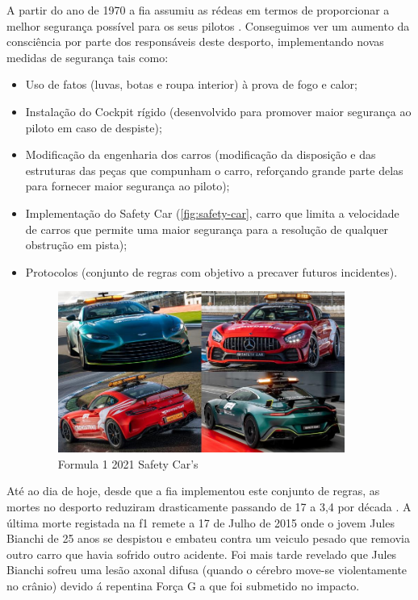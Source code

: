 \documentclass{report}
\begin{document}
A partir do ano de 1970 a \ac{fia} assumiu as rédeas em termos de proporcionar a melhor segurança possível para os seus pilotos \cite{fia}. Conseguimos ver um aumento da consciência por parte dos responsáveis deste desporto, implementando novas medidas de segurança tais como:
\begin{itemize}
\item Uso de fatos (luvas, botas e roupa interior) à prova de fogo e calor;
\item Instalação do Cockpit rígido (desenvolvido para promover maior segurança ao piloto em caso de despiste);
\item Modificação da engenharia dos carros (modificação da disposição e das estruturas das peças que compunham o carro, reforçando grande parte delas para fornecer maior segurança ao piloto);
\item Implementação do Safety Car \cite{safetycar} (\autoref{fig:safety-car}, carro que limita a velocidade de carros que permite uma maior segurança para a resolução de qualquer obstrução em pista);
\item Protocolos (conjunto de regras com objetivo a precaver futuros incidentes). 
\begin{figure}[h]
\center %
\includegraphics[height=150pt]{safety-car}
\caption{Formula 1 2021 Safety Car's}
\label{fig:safety-car}
\end{figure}

\end{itemize}

Até ao dia de hoje, desde que a \ac{fia} implementou este conjunto de regras, as mortes no desporto reduziram drasticamente passando de 17 a 3,4 por década \cite{acidentes}. A última morte registada na \ac{f1} remete a 17 de Julho de 2015 onde o jovem Jules Bianchi \cite{julesbianchi} de 25 anos se despistou e embateu contra um veiculo pesado que removia outro carro que havia sofrido outro acidente. Foi mais tarde revelado que Jules Bianchi sofreu uma lesão axonal difusa \cite{julesbianchi} (quando o cérebro move-se violentamente no crânio) devido á repentina Força G a que foi submetido no impacto.
\end{document}
